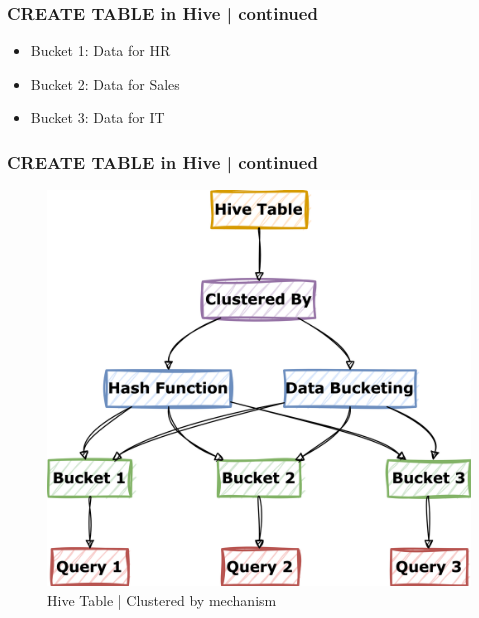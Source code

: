 \begin{frame}
\frametitle{CREATE TABLE in Hive | continued}
\begin{tcolorbox}[colback=white,colframe=black,title= Part 9: Clustering and Sorting | CLUSTERED BY]
	\begin{itemize}
		\item Bucket 1: Data for HR
		\item Bucket 2: Data for Sales
		\item Bucket 3: Data for IT
	\end{itemize}
\end{tcolorbox}
\end{frame}
\begin{frame}
	\frametitle{CREATE TABLE in Hive | continued}		
	\vspace{-0.5cm}
	\begin{tcolorbox}[colback=white,colframe=black,title= Part 9: Clustering and Sorting | CLUSTERED BY]
		\vspace{-0.2cm}
		\begin{figure}
			\includegraphics[width=\textwidth,height=.6\textheight,keepaspectratio]{./Figures/chapter-03/mermaid-diagram-hive_db_clustered_by.png}				
			\caption{Hive Table | Clustered by mechanism}	
		\end{figure}
	\end{tcolorbox}				
\end{frame}
